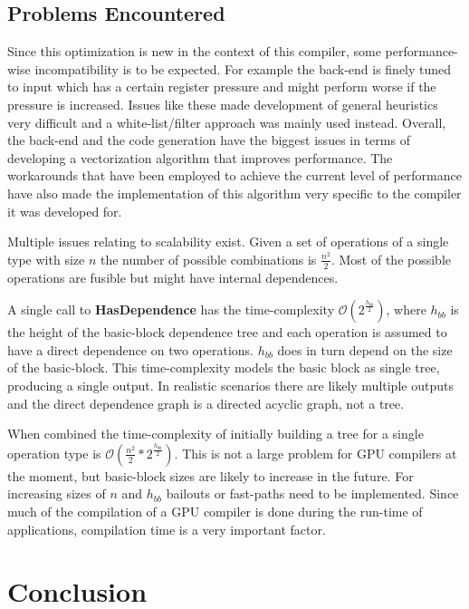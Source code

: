 \documentclass[12pt,a4paper,onecolumn,twoside,openright]{report}
\begin{document}
\section{Problems Encountered}

Since this optimization is new in the context of this compiler, some performance-wise incompatibility is to be expected. For example the back-end is finely tuned to input which has a certain register pressure and might perform worse if the pressure is increased. Issues like these made development of general heuristics very difficult and a white-list/filter approach was mainly used instead.
Overall, the back-end and the code generation have the biggest issues in terms of developing a vectorization algorithm that improves performance. The workarounds that have been employed to achieve the current level of performance have also made the implementation of this algorithm very specific to the compiler it was developed for.

Multiple issues relating to scalability exist. Given a set of operations of a single type with size $n$ the number of possible combinations is $\frac{n^2}{2}$. Most of the possible operations are fusible but might have internal dependences.

A single call to \textbf{HasDependence} has the time-complexity $\mathcal{O}(2^\frac{{h_{bb}}}{2})$, where $h_{bb}$ is the height of the basic-block dependence tree and each operation is assumed to have a direct dependence on two operations. $h_{bb}$ does in turn depend on the size of the basic-block. This time-complexity models the basic block as single tree, producing a single output. In realistic scenarios there are likely multiple outputs and the direct dependence graph is a directed acyclic graph, not a tree.

When combined the time-complexity of initially building a tree for a single operation type is $\mathcal{O}(\frac{n^2}{2}*2^\frac{{h_{bb}}}{2})$. This is not a large problem for GPU compilers at the moment, but basic-block sizes are likely to increase in the future. For increasing sizes of $n$ and $h_{bb}$ bailouts or fast-paths need to be implemented. Since much of the compilation of a GPU compiler is done during the run-time of applications, compilation time is a very important factor.




\chapter{Conclusion}
 \label{chap:conclusion}
\end{document}
